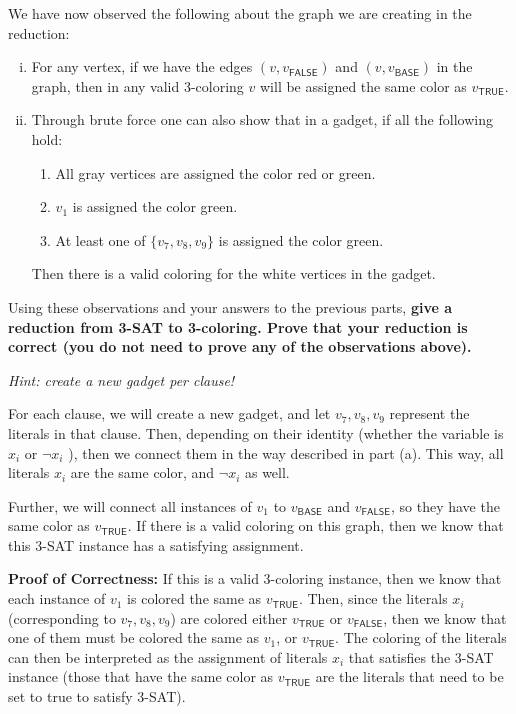 \documentclass[11pt]{article}
\begin{document}
\begin{subparts}
\subpart We have now observed the following about the graph we are creating in the reduction:
\begin{enumerate}[(i)]
\item For any vertex, if we have the edges $(v, v_{\textsf{FALSE}})$ and $(v, v_{\textsf{BASE}})$ in the graph, then in any valid 3-coloring $v$ will be assigned the same color as $v_{\textsf{TRUE}}$. 

\item Through brute force one can also show that in a gadget, if all the following hold:
\begin{enumerate}[(1)]
\item All gray vertices are assigned the color red or green.
\item $v_1$ is assigned the color green.
\item At least one of $\{v_7, v_8, v_9\}$ is assigned the color green.
\end{enumerate}
Then there is a valid coloring for the white vertices in the gadget. 
\end{enumerate}

Using these observations and your answers to the previous parts, \textbf{give
a reduction from 3-SAT to 3-coloring. Prove that your reduction is correct (you do not need to prove any of the observations above). }

\emph{Hint: create a new gadget per clause!}

\begin{solution}
	For each clause, we will create a new gadget, and let \( v_7, v_8, v_9 \) represent the literals in 
	that clause. 
	Then, 
	depending on their identity (whether the variable is \( x_{i} \) or \( \neg x_{i} \) ), then we connect them 
	in the way described in part (a). This way, all literals \( x_i \) are the same color, and \( \neg x_i \) as 
	well. 

	Further, we will connect all instances of \( v_1 \) to \( v_{\textsf{BASE}} \) and \( v_{\textsf{FALSE}} \), 
	so they have the same color as \( v_{\textsf{TRUE}} \). If there is a valid coloring on this 
	graph, then we know that this 3-SAT instance has a satisfying assignment. 

	\textbf{Proof of Correctness:} If this is a valid 3-coloring instance, then we know that each 
	instance of \( v_1 \) is colored the same as \( v_{\textsf{TRUE}} \). Then, since the literals \( x_i \) 
	(corresponding to \( v_7, v_8, v_9 \)) are colored either  
	\( v_{\textsf{TRUE}} \) or \( v_{\textsf{FALSE}} \), then we know that one of them must be colored 
	the same as \( v_1 \), or \( v_{\textsf{TRUE}} \). The coloring of the literals can then be interpreted
	as the assignment of literals \( x_i \) that satisfies the 3-SAT instance (those that have the same color 
	as \( v_{\textsf{TRUE}} \) are the literals that need to be set to true to satisfy 3-SAT).
\end{solution}

\end{subparts}
\end{document}
